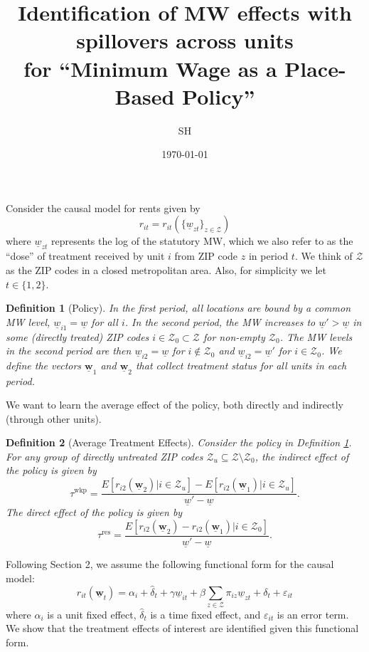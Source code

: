 \documentclass{article}
\title{Identification of MW effects with spillovers across units \\
       \Large for ``Minimum Wage as a Place-Based Policy''}
\author{SH}
\date{\today}
\newtheorem{definition}{Definition}
\newcommand{\Z}{\mathcal{Z}}
\newcommand{\mw}{\underline{w}}
\newcommand{\wkp}{\text{wkp}}
\newcommand{\res}{\text{res}}
\begin{document}
\maketitle


Consider the causal model for rents given by
$$r_{it}=r_{it}(\{\mw_{zt}\}_{z\in\Z})$$
where $\mw_{zt}$ represents the log of the statutory MW, which we also
refer to as the ``dose'' of treatment received by unit $i$ from ZIP code $z$ 
in period $t$.
We think of $\Z$ as the ZIP codes in a closed metropolitan area.
Also, for simplicity we let $t\in\{1,2\}$.

\begin{definition}[Policy]\label{def:policy_change}
    In the first period, all locations are bound by a common MW level, 
    $\mw_{i1}=\mw$ for all $i$.
    In the second period, the MW increases to $\mw'>\mw$ in some 
    (directly treated) ZIP codes $i\in\Z_0\subset\Z$ for non-empty $\Z_0$.
    The MW levels in the second period are then 
    $\mw_{i2}=\mw$ for $i\notin\Z_0$ and
    $\mw_{i2}=\mw'$ for $i\in\Z_0$.
    We define the vectors $\mathbf{\mw}_1$ and $\mathbf{\mw}_2$ that collect
    treatment status for all units in each period.
\end{definition}

We want to learn the average effect of the policy, both directly and indirectly 
(through other units).

\begin{definition}[Average Treatment Effects]\label{def:ate}
    Consider the policy in Definition \ref{def:policy_change}.
    For any group of directly untreated ZIP codes $\Z_u\subseteq\Z\setminus\Z_0$,
    the indirect effect of the policy is given by
    \begin{equation}\label{eq:ate_wkp}
        \tau^{\wkp} = \frac{E\left[r_{i2}(\mathbf{\mw}_2)|i\in\Z_u\right] 
                          - E\left[r_{i2}(\mathbf{\mw}_1)|i\in\Z_u\right]}
                           {\mw'-\mw} .
    \end{equation}
    The direct effect of the policy is given by
    \begin{equation}\label{eq:ate_res}
        \tau^{\res} = \frac{E\left[r_{i2}(\mathbf{\mw}_2) 
                                 - r_{i2}(\mathbf{\mw}_1)|i\in\Z_0\right]}
                           {\mw'-\mw} .
    \end{equation}
\end{definition}

Following Section 2, %
we assume the following functional form for the causal model:
\begin{equation}\label{eq:causal_model}
    r_{it}(\mathbf{\mw}_{t})
           = \alpha_i + \hat\delta_t + \gamma \mw_{it}
           + \beta \sum_{z\in\Z} \pi_{iz} \mw_{zt}
           + \delta_t + \varepsilon_{it}
\end{equation}
where 
$\alpha_i$ is a unit fixed effect,
$\hat \delta_t$ is a time fixed effect, and
$\varepsilon_{it}$ is an error term.
We show that the treatment effects of interest are identified given this 
functional form.
\end{document}
